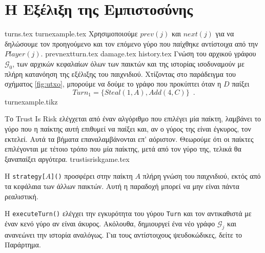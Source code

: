 \section{Η Εξέλιξη της Εμπιστοσύνης}
  {turns.tex}
  {turnexample.tex}
  Χρησιμοποιούμε $prev\left(j\right)$ και $next\left(j\right)$ για να δηλώσουμε τον προηγούμενο και τον επόμενο γύρο που
  παίχθηκε αντίστοιχα από την $Player\left(j\right)$.
  {prevnextturn.tex}
  {damage.tex}
  {history.tex}
  Γνώση του αρχικού γράφου $\mathcal{G}_0$, των αρχικών κεφαλαίων όλων των παικτών και της ιστορίας ισοδυναμούν με πλήρη
  κατανόηση της εξέλιξης του παιχνιδιού. Χτίζοντας στο παράδειγμα του σχήματος \ref{fig:utxo}, μπορούμε να δούμε το γράφο που
  προκύπτει όταν η $D$ παίξει
  \begin{equation}
  \label{turnexample}
     Turn_1 = \{Steal\left(1, A\right), Add\left(4, C\right)\} \enspace.
  \end{equation}
  {turnexample.tikz}

  Το \textlatin{Trust Is Risk} ελέγχεται από έναν αλγόριθμο που επιλέγει μία παί\-κτη, λαμβάνει το γύρο που η παίκτης αυτή
  επιθυμεί να παίξει και, αν ο γύρος της είναι έγκυρος, τον εκτελεί. Αυτά τα βήματα επαναλαμβάνονται επ' αόριστον. Θεωρούμε
  ότι οι παίκτες επιλέγονται με τέτοιο τρόπο που μία παίκτης, μετά από τον γύρο της, τελικά θα ξαναπαίξει αργότερα.
  {trustisriskgame.tex}

  Η \textlatin{\texttt{strategy[}$A$\texttt{]()}} προσφέρει στην παίκτη $A$ πλήρη γνώση του παιχνιδιού, εκτός από τα κεφάλαια των άλλων
  παικτών. Αυτή η παραδοχή μπορεί να μην είναι πάντα ρεαλιστική.

  Η \textlatin{\texttt{executeTurn()}} ελέγχει την εγκυρότητα του γύρου \texttt{\textlatin{Turn}} και τον αντικαθιστά με έναν
  κενό γύρο αν είναι άκυρος. Ακόλουθα, δημιουργεί ένα νέο γράφο $\mathcal{G}_j$ και ανανεώνει την ιστορία αναλόγως. Για τους
  αντίστοιχους ψευδοκώδικες, δείτε το Παράρτημα.
